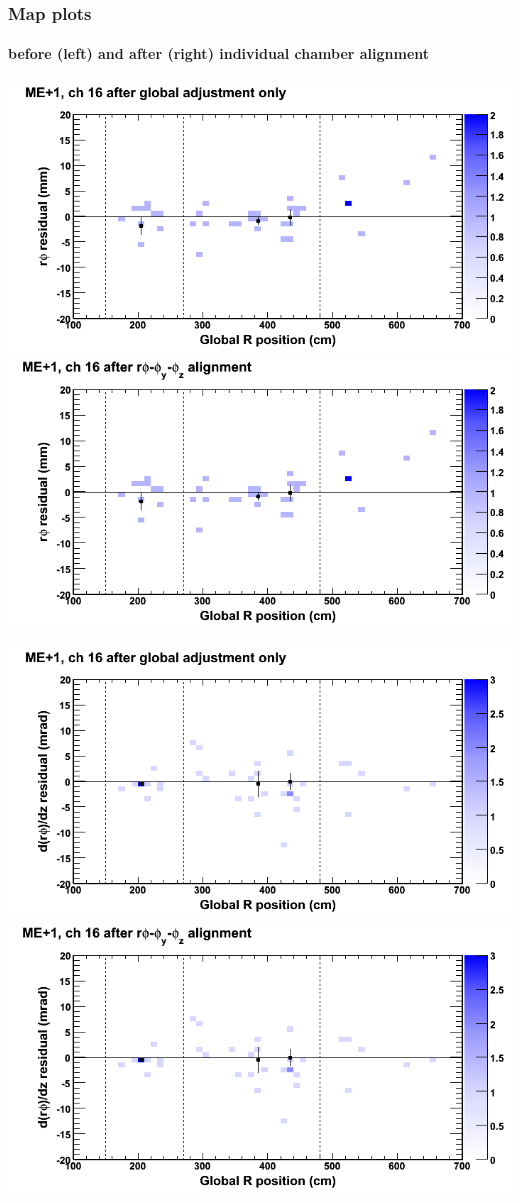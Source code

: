 \documentclass[compress]{beamer}
\begin{document}
\begin{frame}
\frametitle{Map plots}
\framesubtitle{before (left) and after (right) individual chamber alignment}
\includegraphics[width=0.5\linewidth]{ringmapplots_3dof/before_CSCvsr_mep1ch16_x.png} \includegraphics[width=0.5\linewidth]{ringmapplots_3dof/after_CSCvsr_mep1ch16_x.png}

\includegraphics[width=0.5\linewidth]{ringmapplots_3dof/before_CSCvsr_mep1ch16_dxdz.png} \includegraphics[width=0.5\linewidth]{ringmapplots_3dof/after_CSCvsr_mep1ch16_dxdz.png}
\end{frame}
\end{document}
